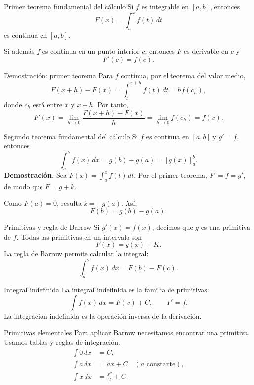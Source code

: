 \documentclass[original_version/main.tex]{subfiles}
\begin{document}
\begin{frame}{Primer teorema fundamental del cálculo}
Si $f$ es integrable en $[a,b]$, entonces\[F(x)=\int_a^x f(t)\,dt\]es continua en $[a,b]$.\par\medskip Si además $f$ es continua en un punto interior $c$, entonces $F$ es derivable en $c$ y\[\boxed{F\prime(c)=f(c).}\]
\end{frame}

\begin{frame}{Demostración: primer teorema}
Para $f$ continua, por el teorema del valor medio,\[F(x+h)-F(x)=\int_x^{x+h}f(t)\,dt=h f(c_h),\]donde $c_h$ está entre $x$ y $x+h$. Por tanto,\[F\prime(x)=\lim_{h\to0}\frac{F(x+h)-F(x)}h=\lim_{h\to0}f(c_h)=f(x).\]
\end{frame}

\begin{frame}{Segundo teorema fundamental del cálculo}
\small Si $f$ es continua en $[a,b]$ y $g\prime=f$, entonces\[\boxed{\int_a^b f(x)\,dx=g(b)-g(a)=[g(x)]_a^b.}\]\textbf{Demostración.} Sea $F(x)=\int_a^x f(t)\,dt$. Por el primer teorema, $F\prime=f=g\prime$, de modo que $F=g+k$.\par\medskip Como $F(a)=0$, resulta $k=-g(a)$. Así,\[F(b)=g(b)-g(a).\]
\end{frame}

\begin{frame}{Primitivas y regla de Barrow}
Si $g\prime(x)=f(x)$, decimos que $g$ es una primitiva de $f$. Todas las primitivas en un intervalo son\[F(x)=g(x)+K.\]La regla de Barrow permite calcular la integral:\[\int_a^b f(x)\,dx=F(b)-F(a).\]
\end{frame}

\begin{frame}{Integral indefinida}
La integral indefinida es la familia de primitivas:\[\boxed{\int f(x)\,dx=F(x)+C,\qquad F\prime=f.}\]La integración indefinida es la operación inversa de la derivación.
\end{frame}

\begin{frame}{Primitivas elementales}
Para aplicar Barrow necesitamos encontrar una primitiva. Usamos tablas y reglas de integración.\begin{align*}\int0\,dx&=C,\\\int a\,dx&=ax+C\quad(a\text{ constante}),\\\int x\,dx&=\frac{x^2}{2}+C.\end{align*}
\end{frame}
\end{document}
